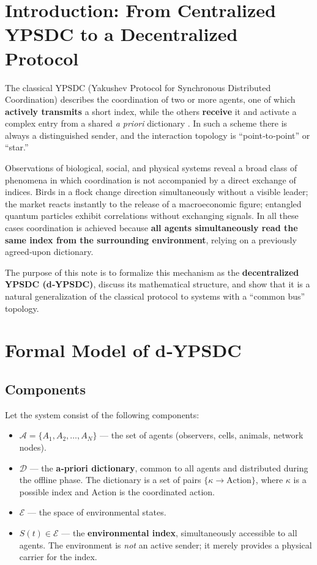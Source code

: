 \documentclass[12pt,a4paper]{article}
\begin{document}
	\tableofcontents
	\newpage
	
	\section{Introduction: From Centralized YPSDC to a Decentralized Protocol}
	
	The classical YPSDC (Yakushev Protocol for Synchronous Distributed Coordination) describes the coordination of two or more agents, one of which \textbf{actively transmits} a short index, while the others \textbf{receive} it and activate a complex entry from a shared \emph{a priori} dictionary \cite{YUCT}. In such a scheme there is always a distinguished sender, and the interaction topology is “point‑to‑point” or “star.”
	
	Observations of biological, social, and physical systems reveal a broad class of phenomena in which coordination is not accompanied by a direct exchange of indices. Birds in a flock change direction simultaneously without a visible leader; the market reacts instantly to the release of a macroeconomic figure; entangled quantum particles exhibit correlations without exchanging signals. In all these cases coordination is achieved because \textbf{all agents simultaneously read the same index from the surrounding environment}, relying on a previously agreed‑upon dictionary.
	
	The purpose of this note is to formalize this mechanism as the \textbf{decentralized YPSDC (d‑YPSDC)}, discuss its mathematical structure, and show that it is a natural generalization of the classical protocol to systems with a “common bus” topology.
	
	\section{Formal Model of d‑YPSDC}
	
	\subsection{Components}
	
	Let the system consist of the following components:
	
	\begin{itemize}[leftmargin=*]
		\item \(\mathcal{A} = \{A_1, A_2, \dots, A_N\}\) — the set of agents (observers, cells, animals, network nodes).
		\item \(\mathcal{D}\) — the \textbf{a‑priori dictionary}, common to all agents and distributed during the offline phase. The dictionary is a set of pairs \(\{ \kappa \to \text{Action} \}\), where \(\kappa\) is a possible index and \(\text{Action}\) is the coordinated action.
		\item \(\mathcal{E}\) — the space of environmental states.
		\item \(S(t) \in \mathcal{E}\) — the \textbf{environmental index}, simultaneously accessible to all agents. The environment is \emph{not} an active sender; it merely provides a physical carrier for the index.
	\end{itemize}
	
\end{document}
